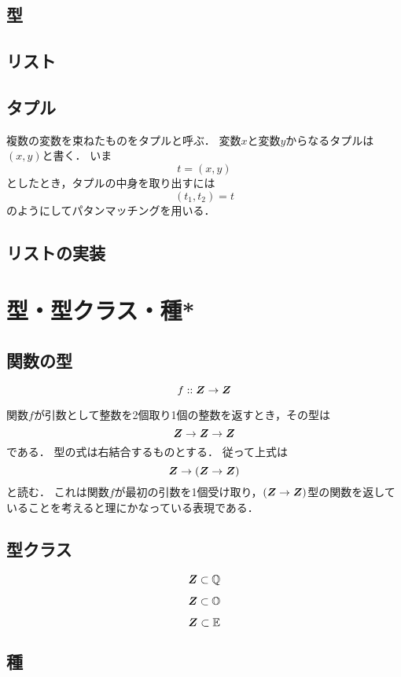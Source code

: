 \documentclass[twocolumn]{jsbook}
\begin{document}
\section{型}

\section{リスト}


\section{タプル}

複数の変数を束ねたものをタプルと呼ぶ．
変数$x$と変数$y$からなるタプルは$(x,y)$と書く．
いま$$t=(x,y)$$としたとき，タプルの中身を取り出すには$$(t_1,t_2)=t$$のようにしてパタンマッチングを用いる．

\section{リストの実装}


\chapter{型・型クラス・種*}

\section{関数の型}

$$f::\bm{Z}\rightarrow\bm{Z}$$

関数$f$が引数として整数を2個取り1個の整数を返すとき，その型は$$\bm{Z}\rightarrow\bm{Z}\rightarrow\bm{Z}$$である．
型の式は右結合するものとする．
従って上式は$$\bm{Z}\rightarrow\left(\bm{Z}\rightarrow\bm{Z}\right)$$と読む．
これは関数$f$が最初の引数を1個受け取り，$(\bm{Z}\rightarrow\bm{Z})$型の関数を返していることを考えると理にかなっている表現である．

\section{型クラス}

$$\bm{Z}\subset\mathbb{Q}$$

$$\bm{Z}\subset\mathbb{O}$$

$$\bm{Z}\subset\mathbb{E}$$


\section{種}
\end{document}
